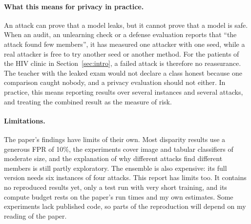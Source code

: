 \documentclass[a4paper]{article}
\begin{document}
\paragraph{What this means for privacy in practice.}
An attack can prove that a model leaks, but it cannot prove that a model is safe.
When an audit, an unlearning check or a defense evaluation reports that ``the attack found few members'', it has measured one attacker with one seed, while a real attacker is free to try another seed or another method.
For the patients of the HIV clinic in Section~\ref{sec:intro}, a failed attack is therefore no reassurance.
The teacher with the leaked exam would not declare a class honest because one comparison caught nobody, and a privacy evaluation should not either.
In practice, this means reporting results over several instances and several attacks, and treating the combined result as the measure of risk.

\paragraph{Limitations.}
The paper's findings have limits of their own.
Most disparity results use a generous FPR of 10\%, the experiments cover image and tabular classifiers of moderate size, and the explanation of why different attacks find different members is still partly exploratory.
The ensemble is also expensive: its full version needs six instances of four attacks.
This report has limits too.
It contains no reproduced results yet, only a test run with very short training, and its compute budget rests on the paper's run times and my own estimates.
Some experiments lack published code, so parts of the reproduction will depend on my reading of the paper.
\end{document}
